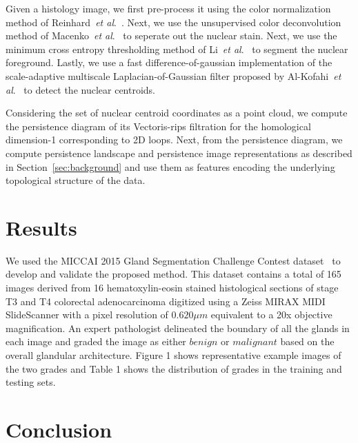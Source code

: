 \documentclass{article}
\newcommand{\etal}{~\textit{et al}.}
\begin{document}
Given a histology image, we first pre-process it using the color normalization method of Reinhard\etal~\cite{Reinhard2001}. Next, we use the unsupervised color deconvolution method of Macenko\etal~\cite{Macenko2009} to seperate out the nuclear stain. Next, we use the minimum cross entropy thresholding method of Li\etal~\cite{Li1998} to segment the nuclear foreground. Lastly, we use a fast difference-of-gaussian implementation of the scale-adaptive multiscale Laplacian-of-Gaussian filter proposed by Al-Kofahi\etal~\cite{Al-Kofahi2010} to detect the nuclear centroids. 

Considering the set of nuclear centroid coordinates as a point cloud, we compute the persistence diagram of its Vectoris-rips filtration for the homological dimension-1 corresponding to 2D loops. Next, from the persistence diagram, we compute persistence landscape and persistence image representations as described in Section~\ref{sec:background} and use them as features encoding the underlying topological structure of the data. 



\section{Results}
\label{sec:results}
We used the MICCAI 2015 Gland Segmentation Challenge Contest dataset~\cite{Sirinukunwattana2017} to develop and validate the proposed method. This dataset contains a total of 165 images derived from 16 hematoxylin-eosin stained histological sections of stage T3 and T4 colorectal adenocarcinoma digitized using a Zeiss MIRAX MIDI SlideScanner with a pixel resolution of $0.620 \mu m$ equivalent to a 20x objective magnification. An expert pathologist delineated the boundary of all the glands in each image and graded the image as either $benign$ or $malignant$ based on the overall glandular architecture. Figure 1 shows representative example images of the two grades and Table 1 shows the distribution of grades in the training and testing sets.

\section{Conclusion}
\label{sec:conclusion}



\end{document}
